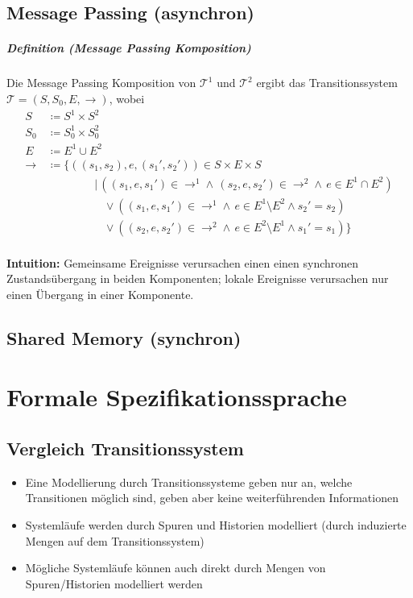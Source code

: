 \documentclass[a4paper, 11pt, accentcolor = tud3b]{tudreport}
\newcommand{\forwhich}{\ensuremath{{\,\vert\,}}}
\newcommand{\subsubparagraph}[1]{\hspace{1cm} \textbf{#1:}}
\newcommand{\definition}[2]{\subparagraph{Definition (#1)} #2}
\newcommand{\intuition}[1]{\subsubparagraph{Intuition} #1}
\begin{document}
			    \subsection{Message Passing (asynchron)}
				    \definition{Message Passing Komposition}{
				    	Die Message Passing Komposition von $ \mathcal{T} ^ 1 $ und $ \mathcal{T} ^ 2 $ ergibt das Transitionssystem $ \mathcal{T} = (S, S _ 0, E, \rightarrow) $, wobei
				    	\begin{align*}
					    	S &\coloneqq S ^ 1 \times S ^ 2 \\
					    	S _ 0 &\coloneqq S _ 0 ^ 1 \times S _ 0 ^ 2 \\
					    	E &\coloneqq E ^ 1 \cup E ^ 2 \\
					    	\rightarrow\, &\coloneqq \{ ((s _ 1, s _ 2), e, (s _ 1 ', s _ 2 ')) \in S \times E \times S \\
						    	& \quad\quad\quad\quad \forwhich ((s _ 1, e, s _ 1 ') \in \rightarrow ^ 1 \land \, (s _ 2, e, s _ 2 ') \in \rightarrow ^ 2 \land \, e \in E ^ 1 \cap E ^ 2)  \\
						    	& \quad\quad\quad\quad\quad \lor ((s _ 1, e, s _ 1 ') \in \rightarrow ^ 1 \land \, e \in E ^ 1 \setminus E ^ 2 \land s _ 2 ' = s _ 2) \\
						    	& \quad\quad\quad\quad\quad \lor ((s _ 2, e, s _ 2 ') \in \rightarrow ^ 2 \land \, e \in E ^ 2 \setminus E ^ 1 \land s _ 1 ' = s _ 1) \} \\
				    	\end{align*}
				    	
				    	\intuition{Gemeinsame Ereignisse verursachen einen einen synchronen Zustandsübergang in beiden Komponenten; lokale Ereignisse verursachen nur einen Übergang in einer Komponente.}
				    }
			    
			    \subsection{Shared Memory (synchron)}
	    
	    \section{Formale Spezifikationssprache}
		    \subsection{Vergleich Transitionssystem}
			    \begin{itemize}
			    	\item Eine Modellierung durch Transitionssysteme geben nur an, welche Transitionen möglich sind, geben aber keine weiterführenden Informationen
			    	\item Systemläufe werden durch Spuren und Historien modelliert (durch induzierte Mengen auf dem Transitionssystem)
			    	\item Mögliche Systemläufe können auch direkt durch Mengen von Spuren/Historien modelliert werden
			    \end{itemize}
		    
\end{document}
